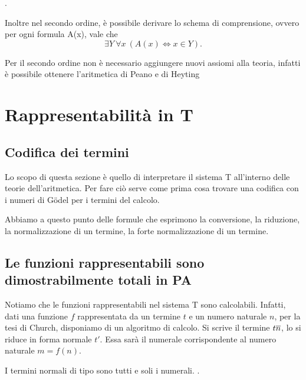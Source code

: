 \documentclass[]{marticle}
\begin{document}
.

Inoltre nel secondo ordine, \`e possibile derivare lo schema di comprensione,
ovvero per ogni formula A(x), vale che
\[
    \exists Y\ \forall x\ (A(x) \iff x\in Y).
\]

\begin{block}[Definizione]
\end{block}

Per il secondo ordine non \`e necessario aggiungere nuovi assiomi alla teoria,
infatti \`e possibile ottenere l'aritmetica di Peano e di Heyting 

\section{Rappresentabilit\`a in T}
\subsection{Codifica dei termini}
Lo scopo di questa sezione \`e quello di interpretare il sistema T all'interno
delle teorie dell'aritmetica. Per fare ci\`o serve come prima cosa trovare una
codifica con i numeri di G\"odel per i termini del calcolo.
\begin{block}[Definizione]
    
\end{block}

Abbiamo a questo punto delle formule che esprimono la conversione, la riduzione,
la normalizzazione di un termine, la forte normalizzazione di un termine.

\subsection{Le funzioni rappresentabili sono dimostrabilmente totali in PA}

Notiamo che le funzioni rappresentabili nel sistema T sono calcolabili. Infatti,
dati una funzione $f$ rappresentata da un termine $t$ e un numero naturale $n$,
per la tesi di Church, disponiamo di un algoritmo di calcolo. Si scrive il
termine $t\overline{n}$, lo si riduce in forma normale $t'$. Essa sar\`a il
numerale corrispondente al numero naturale $m = f(n)$.

\begin{block}[Lemma]
    I termini normali di tipo  sono tutti e soli i numerali.
    .
\end{block}
\end{document}
